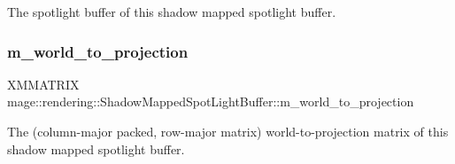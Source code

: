 The spotlight buffer of this shadow mapped spotlight buffer. \hypertarget{structmage_1_1rendering_1_1_shadow_mapped_spot_light_buffer_abb736c590c4a6efff217e15ef8abec4a}{}\label{structmage_1_1rendering_1_1_shadow_mapped_spot_light_buffer_abb736c590c4a6efff217e15ef8abec4a} 
\subsubsection{\texorpdfstring{m\+\_\+world\+\_\+to\+\_\+projection}{m\_world\_to\_projection}}
{\footnotesize\ttfamily X\+M\+M\+A\+T\+R\+IX mage\+::rendering\+::\+Shadow\+Mapped\+Spot\+Light\+Buffer\+::m\+\_\+world\+\_\+to\+\_\+projection}

The (column-\/major packed, row-\/major matrix) world-\/to-\/projection matrix of this shadow mapped spotlight buffer. 